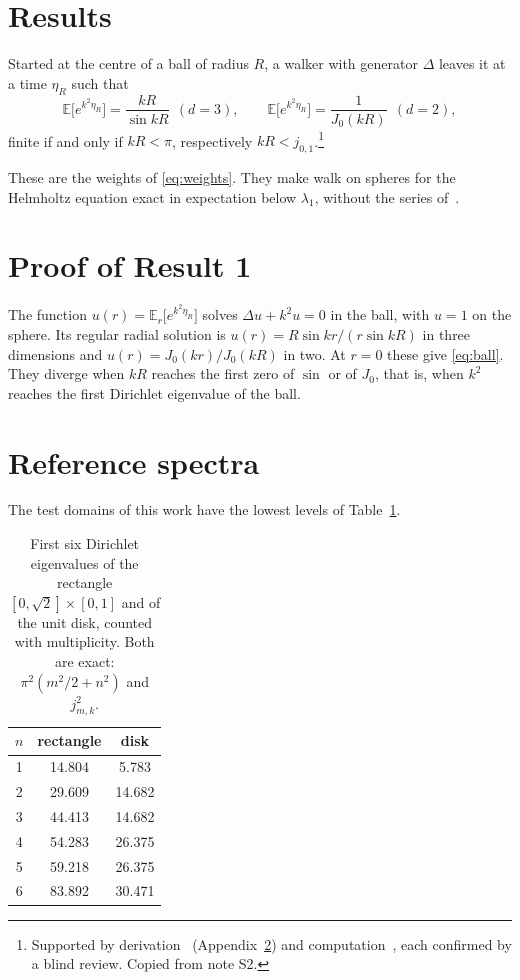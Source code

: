 \documentclass{article}
\begin{document}
\section{Results}
\label{sec:results}
\begin{result}
Started at the centre of a ball of radius $R$, a walker with generator $\Delta$ leaves it at a time $\eta_R$ such that
\begin{equation}
\mathbb E\big[e^{k^2\eta_R}\big]=\frac{kR}{\sin kR}\ \ (d=3),\qquad \mathbb E\big[e^{k^2\eta_R}\big]=\frac{1}{J_0(kR)}\ \ (d=2),
\label{eq:ball}
\end{equation}
finite if and only if $kR<\pi$, respectively $kR<j_{0,1}$.\footnote{Supported by derivation~ (Appendix~\ref{app:ball}) and computation~, each confirmed by a blind review. Copied from note S2.}
\end{result}
These are the weights of \eqref{eq:weights}. They make walk on spheres for the Helmholtz equation exact in expectation below $\lambda_1$, without the series of~\cite{yang2015}.

\appendix
\section{Proof of Result 1}
\label{app:ball}
The function $u(r)=\mathbb E_r\big[e^{k^2\eta_R}\big]$ solves $\Delta u+k^2u=0$ in the ball, with $u=1$ on the sphere. Its regular radial solution is $u(r)=R\sin kr/(r\sin kR)$ in three dimensions and $u(r)=J_0(kr)/J_0(kR)$ in two. At $r=0$ these give \eqref{eq:ball}. They diverge when $kR$ reaches the first zero of $\sin$ or of $J_0$, that is, when $k^2$ reaches the first Dirichlet eigenvalue of the ball.

\section{Reference spectra}
The test domains of this work have the lowest levels of Table~\ref{tab:spectra}.
\begin{table}
\caption{\label{tab:spectra}First six Dirichlet eigenvalues of the rectangle $[0,\sqrt2]\times[0,1]$ and of the unit disk, counted with multiplicity. Both are exact: $\pi^2(m^2/2+n^2)$ and $j_{m,k}^2$.}
\begin{tabular}{ccc}
$n$ & rectangle & disk \\ \hline
1 & 14.804 & 5.783 \\
2 & 29.609 & 14.682 \\
3 & 44.413 & 14.682 \\
4 & 54.283 & 26.375 \\
5 & 59.218 & 26.375 \\
6 & 83.892 & 30.471 \\
\end{tabular}
\end{table}


\end{document}
